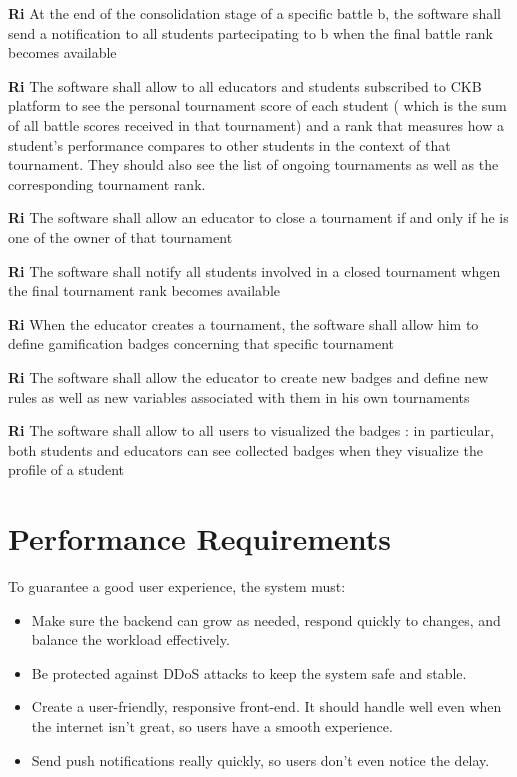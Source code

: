 \begin{requirements}
        \item \textbf{Ri} \quad At the end of the consolidation stage of a specific battle b, the software shall send a notification to all students partecipating to b when the final battle rank becomes available
        \item \textbf{Ri} \quad The software shall allow to all educators and students subscribed to CKB platform to see the personal tournament score of each student ( which is the sum of all battle scores received in that tournament) and a rank that measures how a student's performance compares to other students in the context of that tournament. They should also see the list of ongoing tournaments as well as the corresponding tournament rank.  
        \item \textbf{Ri} \quad The software shall allow an educator to close a tournament if and only if he is one of the owner of that tournament
        \item \textbf{Ri} \quad The software shall notify all students involved in a closed tournament whgen the final tournament rank becomes available
        \item \textbf{Ri} \quad When the educator creates a tournament, the software shall allow him to define gamification badges concerning that specific tournament 
        \item \textbf{Ri} \quad The software shall allow the educator to create new badges and define new rules as well as new variables associated with them in his own tournaments
        \item \textbf{Ri} \quad The software shall allow to all users to visualized the badges : in particular, both students and educators can see collected badges when they visualize the profile of a student
    
    \end{requirements}

\section{Performance Requirements}
To guarantee a good user experience, the system must:

\begin{itemize}
    \item Make sure the backend can grow as needed, respond quickly to changes, and balance the workload effectively.
    \item Be protected against DDoS attacks to keep the system safe and stable.
    \item Create a user-friendly, responsive front-end. It should handle well even when the internet isn't great, so users have a smooth experience.
    \item Send push notifications really quickly, so users don't even notice the delay.
\end{itemize}

